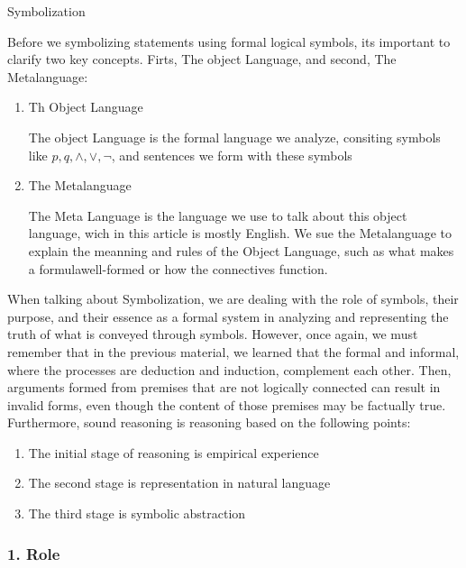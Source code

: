 Symbolization

Before we symbolizing statements using formal logical symbols, its
important to clarify two key concepts. Firts, The object Language, and
second, The Metalanguage:

\begin{enumerate}
\def\labelenumi{\arabic{enumi}.}
\item
  Th Object Language

  The object Language is the formal language we analyze, consiting
  symbols like \(p, q, \wedge, \vee, \neg\), and sentences we form with
  these symbols
\item
  The Metalanguage

  The Meta Language is the language we use to talk about this object
  language, wich in this article is mostly English. We sue the
  Metalanguage to explain the meanning and rules of the Object Language,
  such as what makes a formulawell-formed or how the connectives
  function.
\end{enumerate}

When talking about Symbolization, we are dealing with the role of
symbols, their purpose, and their essence as a formal system in
analyzing and representing the truth of what is conveyed through
symbols. However, once again, we must remember that in the previous
material, we learned that the formal and informal, where the processes
are deduction and induction, complement each other. Then, arguments
formed from premises that are not logically connected can result in
invalid forms, even though the content of those premises may be
factually true. Furthermore, sound reasoning is reasoning based on the
following points:

\begin{enumerate}
\def\labelenumi{\arabic{enumi}.}
\item
  The initial stage of reasoning is empirical experience
\item
  The second stage is representation in natural language
\item
  The third stage is symbolic abstraction
\end{enumerate}

\subsubsection{1. Role}\label{role}

